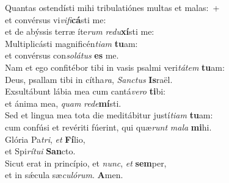 \evenverse Quantas ostendísti mihi tribulatiónes multas et malas:~+\\
\evenverse  et convérsus vi\textit{vi}\textit{fi}\textbf{cá}sti me:~\*\\
\evenverse et de abýssis terræ íte\textit{rum} \textit{re}\textit{du}\textbf{xí}sti me:\\
\oddverse Multiplicásti magnificén\textit{ti}\textit{am} \textbf{tu}am:~\*\\
\oddverse et convérsus con\textit{so}\textit{lá}\textit{tus} \textbf{es} me.\\
\evenverse Nam et ego confitébor tibi in vasis psalmi veri\textit{tá}\textit{tem} \textbf{tu}am:~\*\\
\evenverse Deus, psallam tibi in cítha\textit{ra}, \textit{San}\textit{ctus} \textbf{Is}raël.\\
\oddverse Exsultábunt lábia mea cum cantá\textit{ve}\textit{ro} \textbf{ti}bi:~\*\\
\oddverse et ánima mea, \textit{quam} \textit{re}\textit{de}\textbf{mí}sti.\\
\evenverse Sed et lingua mea tota die meditábitur justí\textit{ti}\textit{am} \textbf{tu}am:~\*\\
\evenverse cum confúsi et revériti fúerint, qui quæ\textit{runt} \textit{ma}\textit{la} \textbf{mi}hi.\\
\oddverse Glória Pa\textit{tri}, \textit{et} \textbf{Fí}lio,~\*\\
\oddverse et Spi\textit{rí}\textit{tu}\textit{i} \textbf{San}cto.\\
\evenverse Sicut erat in princípio, et \textit{nunc}, \textit{et} \textbf{sem}per,~\*\\
\evenverse et in sǽcula sæ\textit{cu}\textit{ló}\textit{rum}. \textbf{A}men.\\
